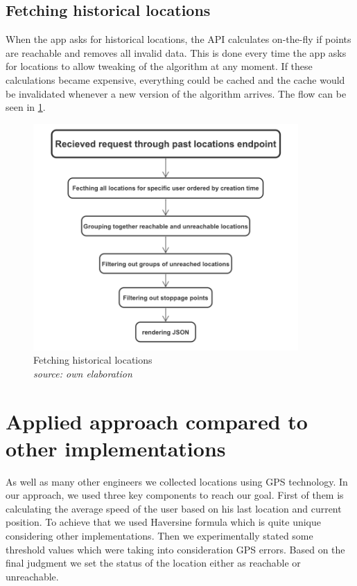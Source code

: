\subsection{Fetching historical locations}
When the app asks for historical locations, the API calculates on-the-fly if points are reachable and removes all invalid data. This is done every time the app asks for locations to allow tweaking of the algorithm at any moment. If these calculations became expensive, everything could be cached and the cache would be invalidated whenever a new version of the algorithm arrives. The flow can be seen in \ref{fig:history}.

\begin{figure}[p]
    \includegraphics[width=0.9\textwidth]{images/history.png}
    \caption{Fetching historical locations \\ \textit{source: own elaboration}}
    \label{fig:history}
\end{figure}

\section{Applied approach compared to other implementations}

As well as many other engineers we collected locations using GPS technology. In our approach, we used three key components to reach our goal. First of them is calculating the average speed of the user based on his last location and current position. To achieve that we used Haversine formula which is quite unique considering other implementations. Then we experimentally stated some threshold values which were taking into consideration GPS errors. Based on the final judgment we set the status of the location either as reachable or unreachable.

